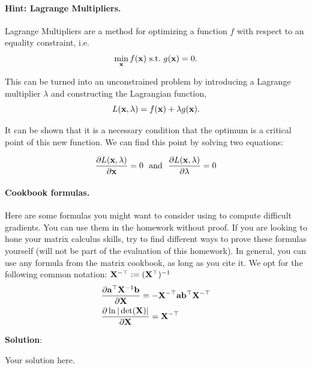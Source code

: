 \documentclass[submit]{../harvardml}
\newenvironment{solution}{
    \vspace{2mm}
    \color{blue}\noindent\textbf{Solution}:
}{}
\begin{document}
\begin{problem}
\paragraph{Hint: Lagrange Multipliers.} Lagrange Multipliers are a method for
optimizing a function $f$ with respect to an
equality constraint, i.e.
\[\min_{\mathbf{x}} f(\mathbf{x})\ \text{s.t.}\ g(\mathbf{x}) = 0.\]

This can be turned into an unconstrained problem by introducing a
Lagrange multiplier $\lambda$ and constructing the Lagrangian function,
\[L(\mathbf{x}, \lambda) =  f(\mathbf{x}) + \lambda g(\mathbf{x}).\]

It can be shown that it is a necessary condition that the optimum
is a critical point of this new function. We can find this point by solving two equations:

\[\frac{\partial L(\mathbf{x}, \lambda)}{\partial  \mathbf{x}} = 0  \ \ \text{and}\  \  \frac{\partial L(\mathbf{x}, \lambda)}{\partial \lambda} = 0 \]


\paragraph{Cookbook formulas.} Here are some formulas you might want to consider
using to compute difficult gradients. You can use them  in the homework
without proof. If you are looking to hone your matrix calculus skills, try to
find different ways to prove these formulas yourself (will not be part of the
evaluation of this homework). In general, you can use any formula from the matrix cookbook,
as long as you cite it. We opt for the following common notation:
$\mathbf{X}^{-\top} := (\mathbf{X}^{\top})^{-1}$
\begin{align*}
   & \frac{\partial \mathbf{a}^\top \mathbf{X}^{-1} \mathbf{b}}{\partial \mathbf{X}} = - \mathbf{X}^{-\top} \mathbf{a} \mathbf{b}^\top \mathbf{X}^{-\top} \\
   & \frac{\partial \ln | \det (\mathbf{X}) |}{\partial \mathbf{X}} = \mathbf{X}^{-\top}
\end{align*}
\end{problem}

\newpage

\begin{solution}
	Your solution here.
\end{solution}
\end{document}
